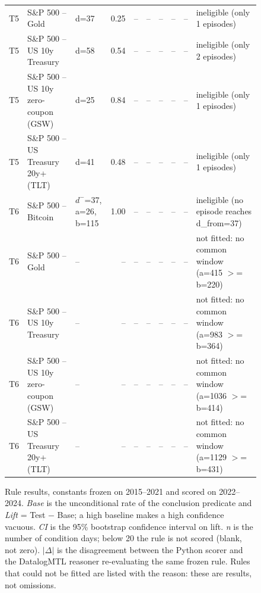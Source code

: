 \begin{figure}
\begin{tabular}{lllrrrrrrl}
T5 & S\&P 500 -- Gold & d=37 & 0.25 & -- & -- & -- & -- & -- & ineligible (only 1 episodes) \\
T5 & S\&P 500 -- US 10y Treasury & d=58 & 0.54 & -- & -- & -- & -- & -- & ineligible (only 2 episodes) \\
T5 & S\&P 500 -- US 10y zero-coupon (GSW) & d=25 & 0.84 & -- & -- & -- & -- & -- & ineligible (only 1 episodes) \\
T5 & S\&P 500 -- US Treasury 20y+ (TLT) & d=41 & 0.48 & -- & -- & -- & -- & -- & ineligible (only 1 episodes) \\
T6 & S\&P 500 -- Bitcoin & $d^-$=37, a=26, b=115 & 1.00 & -- & -- & -- & -- & -- & ineligible (no episode reaches d\_from=37) \\
T6 & S\&P 500 -- Gold & -- & -- & -- & -- & -- & -- & -- & not fitted: no common window (a=415 $>$= b=220) \\
T6 & S\&P 500 -- US 10y Treasury & -- & -- & -- & -- & -- & -- & -- & not fitted: no common window (a=983 $>$= b=364) \\
T6 & S\&P 500 -- US 10y zero-coupon (GSW) & -- & -- & -- & -- & -- & -- & -- & not fitted: no common window (a=1036 $>$= b=414) \\
T6 & S\&P 500 -- US Treasury 20y+ (TLT) & -- & -- & -- & -- & -- & -- & -- & not fitted: no common window (a=1129 $>$= b=431) \\
\bottomrule
\end{tabular}
\caption{Rule results, constants frozen on 2015--2021 and scored on 2022--2024. \emph{Base} is the unconditional rate of the conclusion predicate and \emph{Lift} = Test $-$ Base; a high baseline makes a high confidence vacuous. \emph{CI} is the 95\% bootstrap confidence interval on lift. \emph{n} is the number of condition days; below 20 the rule is not scored (blank, not zero). $|\Delta|$ is the disagreement between the Python scorer and the DatalogMTL reasoner re-evaluating the same frozen rule. Rules that could not be fitted are listed with the reason: these are results, not omissions.}
\label{fig:rule-results}
\end{figure}
